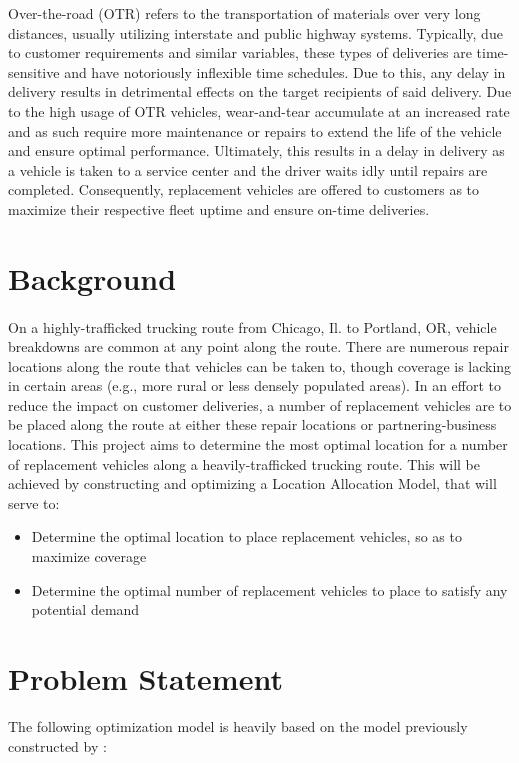 \documentclass{article}
\begin{document}
Over-the-road (OTR) refers to the transportation of materials over very long distances, usually utilizing interstate and public highway systems. Typically, due to customer requirements and similar variables,  these types of deliveries are time-sensitive and have notoriously inflexible time schedules. Due to this, any delay in delivery results in detrimental effects on the target recipients of said delivery. Due to the high usage of OTR vehicles, wear-and-tear accumulate at an increased rate and as such require more maintenance or repairs to extend the life of the vehicle and ensure optimal performance. Ultimately, this results in a delay in delivery as a vehicle is taken to a service center and the driver waits idly until repairs are completed. Consequently, replacement vehicles are offered to customers as to maximize their respective fleet uptime and ensure on-time deliveries.

		
		
\section{Background}
\paragraph{}
On a highly-trafficked trucking route from Chicago, Il. to Portland, OR, vehicle breakdowns are common at any point along the route. There are numerous repair locations along the route that vehicles can be taken to, though coverage is lacking in certain areas (e.g., more rural or less densely populated areas). In an effort to reduce the impact on customer deliveries, a number of  replacement vehicles are to be placed along the route at either these repair locations or partnering-business locations.
This project aims to determine the most optimal location for a number of replacement vehicles along a heavily-trafficked trucking route. This will be achieved by constructing and optimizing a Location Allocation Model,  that will serve to:
\begin{itemize}
	\item{Determine the optimal location to place replacement vehicles, so as to maximize coverage}
	\item{Determine the optimal number of replacement vehicles to place to satisfy any potential demand}
\end{itemize}    	
		
\section{Problem Statement}
	The following optimization model is heavily based on the model previously constructed by \cite{church1974maximal}:
\end{document}
